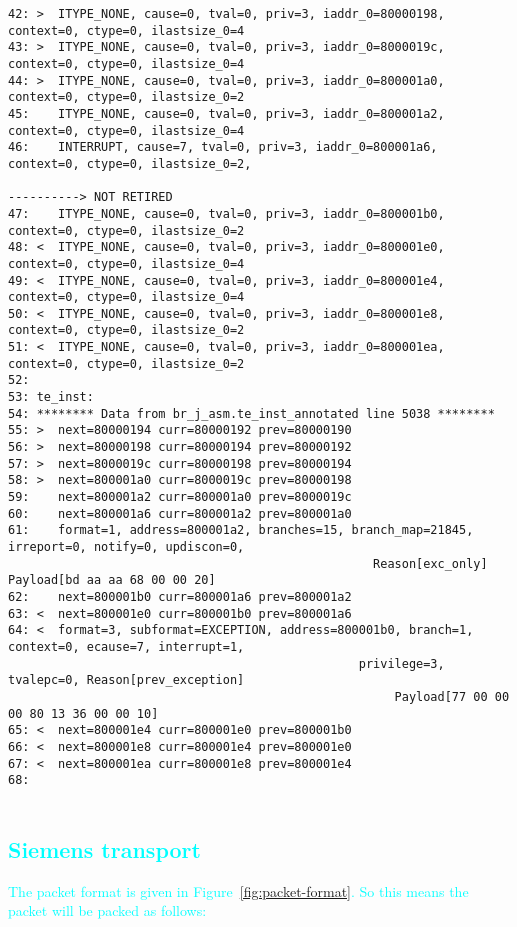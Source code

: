 \begin{lstlisting}[basicstyle=\tiny]
42: >  ITYPE_NONE, cause=0, tval=0, priv=3, iaddr_0=80000198, context=0, ctype=0, ilastsize_0=4
43: >  ITYPE_NONE, cause=0, tval=0, priv=3, iaddr_0=8000019c, context=0, ctype=0, ilastsize_0=4
44: >  ITYPE_NONE, cause=0, tval=0, priv=3, iaddr_0=800001a0, context=0, ctype=0, ilastsize_0=2
45:    ITYPE_NONE, cause=0, tval=0, priv=3, iaddr_0=800001a2, context=0, ctype=0, ilastsize_0=4
46:    INTERRUPT, cause=7, tval=0, priv=3, iaddr_0=800001a6, context=0, ctype=0, ilastsize_0=2,
                                                                              ----------> NOT RETIRED
47:    ITYPE_NONE, cause=0, tval=0, priv=3, iaddr_0=800001b0, context=0, ctype=0, ilastsize_0=2
48: <  ITYPE_NONE, cause=0, tval=0, priv=3, iaddr_0=800001e0, context=0, ctype=0, ilastsize_0=4
49: <  ITYPE_NONE, cause=0, tval=0, priv=3, iaddr_0=800001e4, context=0, ctype=0, ilastsize_0=4
50: <  ITYPE_NONE, cause=0, tval=0, priv=3, iaddr_0=800001e8, context=0, ctype=0, ilastsize_0=2
51: <  ITYPE_NONE, cause=0, tval=0, priv=3, iaddr_0=800001ea, context=0, ctype=0, ilastsize_0=2
52:
53: te_inst:
54: ******** Data from br_j_asm.te_inst_annotated line 5038 ********
55: >  next=80000194 curr=80000192 prev=80000190
56: >  next=80000198 curr=80000194 prev=80000192
57: >  next=8000019c curr=80000198 prev=80000194
58: >  next=800001a0 curr=8000019c prev=80000198
59:    next=800001a2 curr=800001a0 prev=8000019c
60:    next=800001a6 curr=800001a2 prev=800001a0
61:    format=1, address=800001a2, branches=15, branch_map=21845, irreport=0, notify=0, updiscon=0,
                                                   Reason[exc_only] Payload[bd aa aa 68 00 00 20]
62:    next=800001b0 curr=800001a6 prev=800001a2
63: <  next=800001e0 curr=800001b0 prev=800001a6
64: <  format=3, subformat=EXCEPTION, address=800001b0, branch=1, context=0, ecause=7, interrupt=1,
                                                 privilege=3, tvalepc=0, Reason[prev_exception]
                                                      Payload[77 00 00 00 80 13 36 00 00 10]
65: <  next=800001e4 curr=800001e0 prev=800001b0
66: <  next=800001e8 curr=800001e4 prev=800001e0
67: <  next=800001ea curr=800001e8 prev=800001e4
68:
  
\end{lstlisting}

\textcolor{cyan}{\subsection{Siemens transport}}

\textcolor{cyan}{The packet format is given in Figure~\ref{fig:packet-format}. So this means the packet will be packed as follows:}

